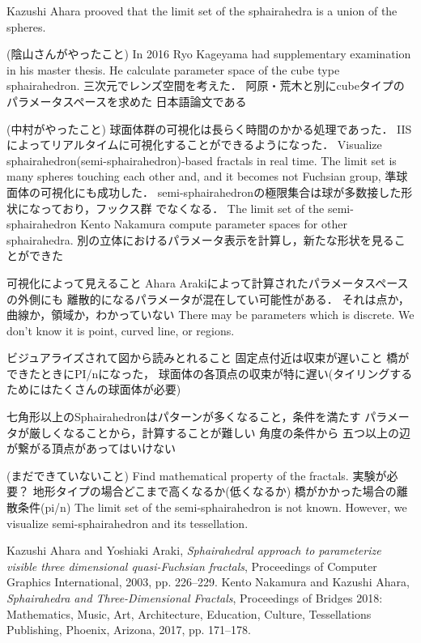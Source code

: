 \documentclass[dvipdfmx]{interact}
\theoremstyle{plain}%
\theoremstyle{definition}
\theoremstyle{remark}
\begin{document}
Kazushi Ahara prooved that the limit set of the sphairahedra
is a union of the spheres.

(陰山さんがやったこと)
In 2016 Ryo Kageyama had supplementary examination in his master thesis.
He calculate parameter space of the cube type sphairahedron.
三次元でレンズ空間を考えた．
阿原・荒木と別にcubeタイプのパラメータスペースを求めた
日本語論文である

(中村がやったこと)
球面体群の可視化は長らく時間のかかる処理であった．
IISによってリアルタイムに可視化することができるようになった．
Visualize sphairahedron(semi-sphairahedron)-based fractals in real time.
The limit set is many spheres touching each other and,
and it becomes not Fuchsian group,
準球面体の可視化にも成功した．
semi-sphairahedronの極限集合は球が多数接した形状になっており，フックス群
でなくなる．
The limit set of the semi-sphairahedron
Kento Nakamura compute parameter spaces for other sphairahedra.
別の立体におけるパラメータ表示を計算し，新たな形状を見ることができた

可視化によって見えること
Ahara Arakiによって計算されたパラメータスペースの外側にも
離散的になるパラメータが混在してい可能性がある．
それは点か，曲線か，領域か，わかっていない
There may be parameters which is discrete.
We don't know it is point, curved line, or regions.

ビジュアライズされて図から読みとれること
固定点付近は収束が遅いこと
橋ができたときにPI/nになった，
球面体の各頂点の収束が特に遅い(タイリングするためにはたくさんの球面体が必要)

七角形以上のSphairahedronはパターンが多くなること，条件を満たす
パラメータが厳しくなることから，計算することが難しい
角度の条件から
五つ以上の辺が繋がる頂点があってはいけない


(まだできていないこと)
Find mathematical property of the fractals.
実験が必要？
地形タイプの場合どこまで高くなるか(低くなるか)
橋がかかった場合の離散条件(pi/n)
The limit set of the semi-sphairahedron is not known.
However, we visualize semi-sphairahedron and its tessellation.



\begin{thebibliography}{99}
        Kazushi Ahara and Yoshiaki Araki,
        \emph{Sphairahedral approach to parameterize visible three
        dimensional quasi-Fuchsian fractals},
        Proceedings of Computer Graphics International, 2003, pp. 226--229.
        Kento Nakamura and Kazushi Ahara,
        \emph{Sphairahedra and Three-Dimensional Fractals}, 
        Proceedings of Bridges 2018: Mathematics, Music, Art, Architecture,
        Education, Culture, Tessellations Publishing,
        Phoenix, Arizona, 2017, pp. 171--178.
\end{thebibliography}
\end{document}
